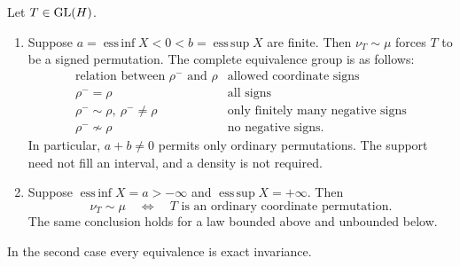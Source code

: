 \begin{theorem}
\label{thm:bounded-and-half-line-classification}
Let \(T\in\operatorname{GL}(H)\).
\begin{enumerate}
 \item Suppose \(a=\operatorname{ess\,inf}X<0<
 b=\operatorname{ess\,sup}X\) are finite.
 Then \(\nu_T\sim\mu\) forces \(T\) to be a signed permutation.
 The complete equivalence group is as follows:
 \[
 \begin{array}{c|l}
 \text{relation between }\rho^-\text{ and }\rho&\text{allowed coordinate signs}\\ \hline
 \rho^-=\rho&\text{all signs}\\
 \rho^-\sim\rho,\ \rho^-\ne\rho&
                  \text{only finitely many negative signs}\\
 \rho^-\not\sim\rho&\text{no negative signs}.
 \end{array}
 \]
 In particular, \(a+b\ne0\) permits only ordinary permutations.
 The support need not fill an interval, and a density is not required.
 \item Suppose \(\operatorname{ess\,inf}X=a>-\infty\) and
 \(\operatorname{ess\,sup}X=+\infty\).
 Then
 \[
  \nu_T\sim\mu
   \quad\Longleftrightarrow\quad
  T\text{ is an ordinary coordinate permutation}.
 \]
 The same conclusion holds for a law bounded above and unbounded below.
\end{enumerate}
In the second case every equivalence is exact invariance.
\end{theorem}

